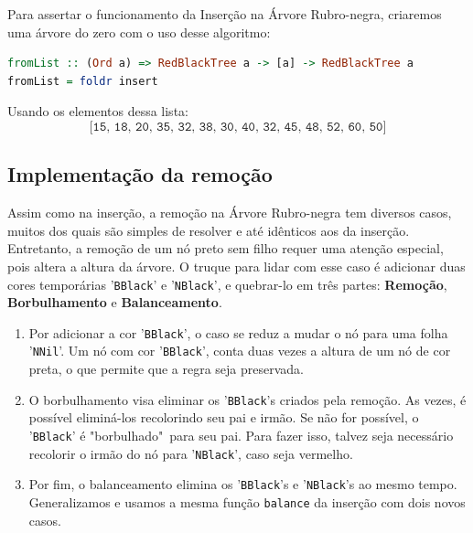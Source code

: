 Para assertar o funcionamento da Inserção na Árvore Rubro-negra, criaremos uma árvore do zero com o uso desse algoritmo:

\begin{lstlisting}[language=haskell]
fromList :: (Ord a) => RedBlackTree a -> [a] -> RedBlackTree a
fromList = foldr insert
\end{lstlisting}
\FloatBarrier

\noindent
Usando os elementos dessa lista:
$$
	\texttt{[15, 18, 20, 35, 32, 38, 30, 40, 32, 45, 48, 52, 60, 50]}
$$
\begin{figure}[!ht]
	\centering
\end{figure}
\FloatBarrier

\subsection{Implementação da remoção}

Assim como na inserção, a remoção na Árvore Rubro-negra tem diversos casos, muitos dos quais são simples de resolver e até idênticos aos da inserção. Entretanto, a remoção de um nó preto sem filho requer uma atenção especial, pois altera a altura da árvore. O truque para lidar com esse caso é adicionar duas cores temporárias '\texttt{BBlack}' e '\texttt{NBlack}', e quebrar-lo em três partes: \textbf{Remoção}, \textbf{Borbulhamento} e \textbf{Balanceamento}.


\begin{enumerate}
	\item Por adicionar a cor '\texttt{BBlack}', o caso se reduz a mudar o nó para uma folha '\texttt{NNil}'. Um nó com cor '\texttt{BBlack}', conta duas vezes a altura de um nó de cor preta, o que permite que a regra seja preservada.
	\item O borbulhamento visa eliminar os '\texttt{BBlack}'s criados pela remoção. As vezes, é possível eliminá-los recolorindo seu pai e irmão. Se não for possível, o '\texttt{BBlack}' é  "borbulhado"\ para seu pai. Para fazer isso, talvez seja necessário recolorir o irmão do nó para '\texttt{NBlack}', caso seja vermelho.
	\item Por fim, o balanceamento elimina os '\texttt{BBlack}'s e '\texttt{NBlack}'s ao mesmo tempo. Generalizamos e usamos a mesma função \texttt{balance} da inserção com dois novos casos.
\end{enumerate}


